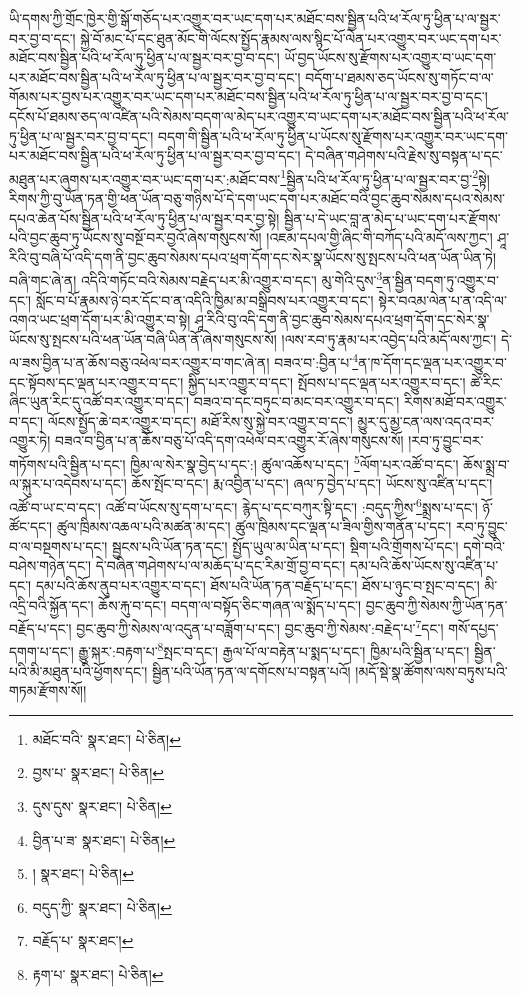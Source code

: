 ཡི་དགས་ཀྱི་གྲོང་ཁྱེར་གྱི་སྒོ་གཅོད་པར་འགྱུར་བར་ཡང་དག་པར་མཐོང་བས་སྦྱིན་པའི་ཕ་རོལ་ཏུ་ཕྱིན་པ་ལ་སྦྱར་བར་བྱ་བ་དང་། སྐྱེ་བོ་མང་པོ་དང་ཐུན་མོང་གི་ལོངས་སྤྱོད་རྣམས་ལས་སྙིང་པོ་ལེན་པར་འགྱུར་བར་ཡང་དག་པར་མཐོང་བས་སྦྱིན་པའི་ཕ་རོལ་ཏུ་ཕྱིན་པ་ལ་སྦྱར་བར་བྱ་བ་དང་། ཡོ་བྱད་ཡོངས་སུ་རྫོགས་པར་འགྱུར་བ་ཡང་དག་པར་མཐོང་བས་སྦྱིན་པའི་ཕ་རོལ་ཏུ་ཕྱིན་པ་ལ་སྦྱར་བར་བྱ་བ་དང་། བདོག་པ་ཐམས་ཅད་ཡོངས་སུ་གཏོང་བ་ལ་གོམས་པར་བྱས་པར་འགྱུར་བར་ཡང་དག་པར་མཐོང་བས་སྦྱིན་པའི་ཕ་རོལ་ཏུ་ཕྱིན་པ་ལ་སྦྱར་བར་བྱ་བ་དང་། དངོས་པོ་ཐམས་ཅད་ལ་འཛིན་པའི་སེམས་བདག་ལ་མེད་པར་འགྱུར་བ་ཡང་དག་པར་མཐོང་བས་སྦྱིན་པའི་ཕ་རོལ་ཏུ་ཕྱིན་པ་ལ་སྦྱར་བར་བྱ་བ་དང་། བདག་གི་སྦྱིན་པའི་ཕ་རོལ་ཏུ་ཕྱིན་པ་ཡོངས་སུ་རྫོགས་པར་འགྱུར་བར་ཡང་དག་པར་མཐོང་བས་སྦྱིན་པའི་ཕ་རོལ་ཏུ་ཕྱིན་པ་ལ་སྦྱར་བར་བྱ་བ་དང་། དེ་བཞིན་གཤེགས་པའི་རྗེས་སུ་བསྟན་པ་དང་མཐུན་པར་ཞུགས་པར་འགྱུར་བར་ཡང་དག་པར་:མཐོང་བས་\footnote{མཐོང་བའི་  སྣར་ཐང་།  པེ་ཅིན། }སྦྱིན་པའི་ཕ་རོལ་ཏུ་ཕྱིན་པ་ལ་སྦྱར་བར་བྱ་\footnote{བྱས་པ་  སྣར་ཐང་།  པེ་ཅིན། }སྟེ། རིགས་ཀྱི་བུ་ཡོན་ཏན་གྱི་ཕན་ཡོན་བཅུ་གཉིས་པོ་དེ་དག་ཡང་དག་པར་མཐོང་བའི་བྱང་ཆུབ་སེམས་དཔའ་སེམས་དཔའ་ཆེན་པོས་སྦྱིན་པའི་ཕ་རོལ་ཏུ་ཕྱིན་པ་ལ་སྦྱར་བར་བྱ་སྟེ། སྦྱིན་པ་དེ་ཡང་བླ་ན་མེད་པ་ཡང་དག་པར་རྫོགས་པའི་བྱང་ཆུབ་ཏུ་ཡོངས་སུ་བསྔོ་བར་བྱའོ་ཞེས་གསུངས་སོ། །འཇམ་དཔལ་གྱི་ཞིང་གི་བཀོད་པའི་མདོ་ལས་ཀྱང་། ཤཱ་རིའི་བུ་བཞི་པོ་འདི་དག་ནི་བྱང་ཆུབ་སེམས་དཔའ་ཕྲག་དོག་དང་སེར་སྣ་ཡོངས་སུ་སྤངས་པའི་ཕན་ཡོན་ཡིན་ཏེ། བཞི་གང་ཞེ་ན། འདིའི་གཏོང་བའི་སེམས་བརྗེད་པར་མི་འགྱུར་བ་དང་། མུ་གེའི་དུས་\footnote{དུས་དུས་  སྣར་ཐང་།  པེ་ཅིན། }ན་སྦྱིན་བདག་ཏུ་འགྱུར་བ་དང་། སློང་བ་པོ་རྣམས་ཉེ་བར་དོང་བ་ན་འདིའི་ཁྱིམ་མ་བསྒྲིབས་པར་འགྱུར་བ་དང་། སྟེར་བའམ་ལེན་པ་ན་འདི་ལ་འགའ་ཡང་ཕྲག་དོག་པར་མི་འགྱུར་བ་སྟེ། ཤཱ་རིའི་བུ་འདི་དག་ནི་བྱང་ཆུབ་སེམས་དཔའ་ཕྲག་དོག་དང་སེར་སྣ་ཡོངས་སུ་སྤངས་པའི་ཕན་ཡོན་བཞི་ཡིན་ནོ་ཞེས་གསུངས་སོ། །ལས་རབ་ཏུ་རྣམ་པར་འབྱེད་པའི་མདོ་ལས་ཀྱང་། དེ་ལ་ཟས་བྱིན་པ་ན་ཆོས་བཅུ་འཕེལ་བར་འགྱུར་བ་གང་ཞེ་ན། བཟའ་བ་:བྱིན་པ་\footnote{བྱིན་པ་ཟ་  སྣར་ཐང་།  པེ་ཅིན། }ན་ཁ་དོག་དང་ལྡན་པར་འགྱུར་བ་དང་སྟོབས་དང་ལྡན་པར་འགྱུར་བ་དང་། སྐྱིད་པར་འགྱུར་བ་དང་། སྤོབས་པ་དང་ལྡན་པར་འགྱུར་བ་དང་། ཚེ་རིང་ཞིང་ཡུན་རིང་དུ་འཚོ་བར་འགྱུར་བ་དང་། བཟའ་བ་དང་བཏུང་བ་མང་བར་འགྱུར་བ་དང་། རིགས་མཐོ་བར་འགྱུར་བ་དང་། ལོངས་སྤྱོད་ཆེ་བར་འགྱུར་བ་དང་། མཐོ་རིས་སུ་སྐྱེ་བར་འགྱུར་བ་དང་། མྱུར་དུ་མྱ་ངན་ལས་འདའ་བར་འགྱུར་ཏེ། བཟའ་བ་བྱིན་པ་ན་ཆོས་བཅུ་པོ་འདི་དག་འཕེལ་བར་འགྱུར་རོ་ཞེས་གསུངས་སོ། །རབ་ཏུ་བྱུང་བར་གཏོགས་པའི་སྦྱིན་པ་དང་། ཁྱིམ་ལ་སེར་སྣ་བྱེད་པ་དང་:། ཚུལ་འཆོས་པ་དང་། \footnote{།    སྣར་ཐང་།  པེ་ཅིན། }ལོག་པར་འཚོ་བ་དང་། ཆོས་སྨྲ་བ་ལ་སྐུར་པ་འདེབས་པ་དང་། ཆོས་སྤོང་བ་དང་། རྨ་འབྱིན་པ་དང་། ཞལ་ཏ་བྱེད་པ་དང་། ཡོངས་སུ་འཛིན་པ་དང་། འཚོ་བ་ཡ་ང་བ་དང་། འཚོ་བ་ཡོངས་སུ་དག་པ་དང་། རྙེད་པ་དང་བཀུར་སྟི་དང་། :བདུད་ཀྱིས་\footnote{བདུད་ཀྱི་  སྣར་ཐང་།  པེ་ཅིན། }སྨྲས་པ་དང་། ཉོ་ཚོང་དང་། ཚུལ་ཁྲིམས་འཆལ་པའི་མཚན་མ་དང་། ཚུལ་ཁྲིམས་དང་ལྡན་པ་ཟིལ་གྱིས་གནོན་པ་དང་། རབ་ཏུ་བྱུང་བ་ལ་བསྔགས་པ་དང་། སྦྱངས་པའི་ཡོན་ཏན་དང་། སྤྱོད་ཡུལ་མ་ཡིན་པ་དང་། སྡིག་པའི་གྲོགས་པོ་དང་། དགེ་བའི་བཤེས་གཉེན་དང་། དེ་བཞིན་གཤེགས་པ་ལ་མཆོད་པ་དང་རིམ་གྲོ་བྱ་བ་དང་། དམ་པའི་ཆོས་ཡོངས་སུ་འཛིན་པ་དང་། དམ་པའི་ཆོས་ནུབ་པར་འགྱུར་བ་དང་། ཐོས་པའི་ཡོན་ཏན་བརྗོད་པ་དང་། ཐོས་པ་ཉུང་བ་སྤང་བ་དང་། མི་འདྲི་བའི་སྐྱོན་དང་། ཆོས་རྐུ་བ་དང་། བདག་ལ་བསྟོད་ཅིང་གཞན་ལ་སྨོད་པ་དང་། བྱང་ཆུབ་ཀྱི་སེམས་ཀྱི་ཡོན་ཏན་བརྗོད་པ་དང་། བྱང་ཆུབ་ཀྱི་སེམས་ལ་འདུན་པ་བཟློག་པ་དང་། བྱང་ཆུབ་ཀྱི་སེམས་:བརྗེད་པ་\footnote{བརྗོད་པ་  སྣར་ཐང་། }དང་། གསོ་དཔྱད་དགག་པ་དང་། རྒྱུ་སྐར་:བརྟག་པ་\footnote{རྟག་པ་  སྣར་ཐང་།  པེ་ཅིན། }སྤང་བ་དང་། རྒྱལ་པོ་ལ་བརྟེན་པ་སྨད་པ་དང་། ཁྱིམ་པའི་སྦྱིན་པ་དང་། སྦྱིན་པའི་མི་མཐུན་པའི་ཕྱོགས་དང་། སྦྱིན་པའི་ཡོན་ཏན་ལ་དགོངས་པ་བསྟན་པའོ། །མདོ་སྡེ་སྣ་ཚོགས་ལས་བཏུས་པའི་གཏམ་རྫོགས་སོ།། 